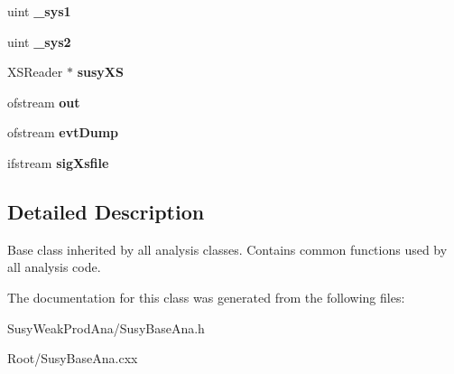 \begin{DoxyCompactItemize}
\item 
\hypertarget{classSusyBaseAna_a964237851f19aa3e9804fab95f71688f}{
uint {\bfseries \_\-sys1}}
\label{classSusyBaseAna_a964237851f19aa3e9804fab95f71688f}

\item 
\hypertarget{classSusyBaseAna_a5f1448f8ab04639816ab6c0f199fca5e}{
uint {\bfseries \_\-sys2}}
\label{classSusyBaseAna_a5f1448f8ab04639816ab6c0f199fca5e}

\item 
\hypertarget{classSusyBaseAna_adeadb0175b1d269ac471adfb4308ee80}{
XSReader $\ast$ {\bfseries susyXS}}
\label{classSusyBaseAna_adeadb0175b1d269ac471adfb4308ee80}

\item 
\hypertarget{classSusyBaseAna_a4a3f6e6a46a87dc92765a5b30a460781}{
ofstream {\bfseries out}}
\label{classSusyBaseAna_a4a3f6e6a46a87dc92765a5b30a460781}

\item 
\hypertarget{classSusyBaseAna_a442fe2a2c2bd557a54f1aecf3c8d7147}{
ofstream {\bfseries evtDump}}
\label{classSusyBaseAna_a442fe2a2c2bd557a54f1aecf3c8d7147}

\item 
\hypertarget{classSusyBaseAna_a2532294a1f669a773730d8a89ac95335}{
ifstream {\bfseries sigXsfile}}
\label{classSusyBaseAna_a2532294a1f669a773730d8a89ac95335}

\end{DoxyCompactItemize}


\subsection{Detailed Description}
Base class inherited by all analysis classes. Contains common functions used by all analysis code. 

The documentation for this class was generated from the following files:\begin{DoxyCompactItemize}
\item 
SusyWeakProdAna/SusyBaseAna.h\item 
Root/SusyBaseAna.cxx\end{DoxyCompactItemize}
